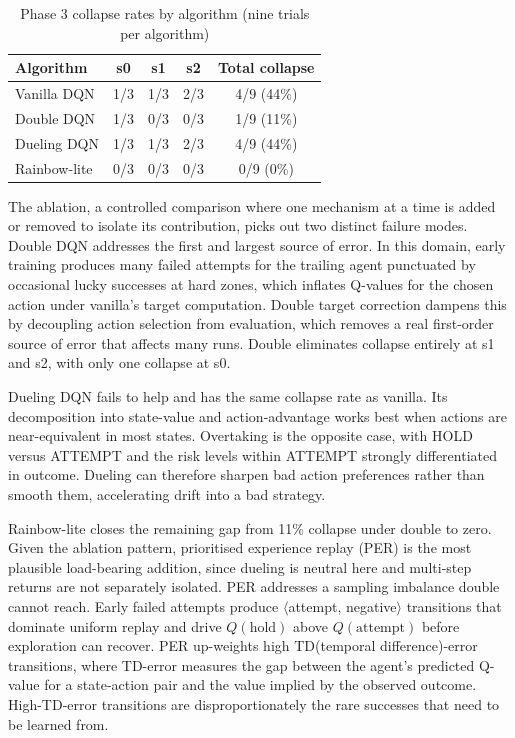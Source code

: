 \begin{table}[htbp]
\centering
\small
\caption{Phase 3 collapse rates by algorithm (nine trials per algorithm)}
\label{tab:phase3-collapse}
\begin{tabular}{|l|c|c|c|c|}
\hline
\textbf{Algorithm} & \textbf{s0} & \textbf{s1} & \textbf{s2} & \textbf{Total collapse} \\
\hline
Vanilla DQN   & 1/3 & 1/3 & 2/3 & 4/9 (44\%) \\
Double DQN    & 1/3 & 0/3 & 0/3 & 1/9 (11\%) \\
Dueling DQN   & 1/3 & 1/3 & 2/3 & 4/9 (44\%) \\
Rainbow-lite  & 0/3 & 0/3 & 0/3 & 0/9 (0\%)  \\
\hline
\end{tabular}
\end{table}

The ablation, a controlled comparison where one mechanism at a time is added or removed to isolate its contribution, picks out two distinct failure modes. Double DQN addresses the first and largest source of error. In this domain, early training produces many failed attempts for the trailing agent punctuated by occasional lucky successes at hard zones, which inflates Q-values for the chosen action under vanilla's target computation. Double target correction dampens this by decoupling action selection from evaluation, which removes a real first-order source of error that affects many runs. Double eliminates collapse entirely at s1 and s2, with only one collapse at s0.

Dueling DQN fails to help and has the same collapse rate as vanilla. Its decomposition into state-value and action-advantage works best when actions are near-equivalent in most states. Overtaking is the opposite case, with HOLD versus ATTEMPT and the risk levels within ATTEMPT strongly differentiated in outcome. Dueling can therefore sharpen bad action preferences rather than smooth them, accelerating drift into a bad strategy.

Rainbow-lite closes the remaining gap from 11\% collapse under double to zero. Given the ablation pattern, prioritised experience replay (PER) is the most plausible load-bearing addition, since dueling is neutral here and multi-step returns are not separately isolated. PER addresses a sampling imbalance double cannot reach. Early failed attempts produce $\langle$attempt, negative$\rangle$ transitions that dominate uniform replay and drive $Q(\text{hold})$ above $Q(\text{attempt})$ before exploration can recover. PER up-weights high TD(temporal difference)-error transitions, where TD-error measures the gap between the agent's predicted Q-value for a state-action pair and the value implied by the observed outcome. High-TD-error transitions are disproportionately the rare successes that need to be learned from.

